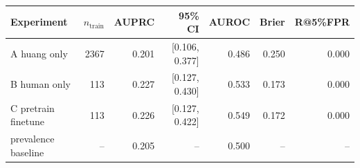 \begin{tabular}{lrrrrrr}
\toprule
Experiment & $n_{\text{train}}$ & AUPRC & 95\% CI & AUROC & Brier & R@5\%FPR \\
\midrule
A huang only & 2367 & 0.201 & [0.106, 0.377] & 0.486 & 0.250 & 0.000 \\
B human only & 113 & 0.227 & [0.127, 0.430] & 0.533 & 0.173 & 0.000 \\
C pretrain finetune & 113 & 0.226 & [0.127, 0.422] & 0.549 & 0.172 & 0.000 \\
\midrule
prevalence baseline & -- & 0.205 & -- & 0.500 & -- & -- \\
\bottomrule
\end{tabular}
